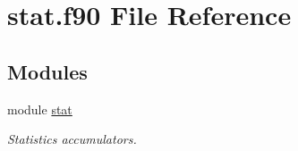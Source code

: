 \hypertarget{stat_8f90}{}\section{stat.\+f90 File Reference}
\label{stat_8f90}
\subsection*{Modules}
\begin{DoxyCompactItemize}
\item 
module \hyperlink{namespacestat}{stat}
\begin{DoxyCompactList}\small\item\em Statistics accumulators. \end{DoxyCompactList}\end{DoxyCompactItemize}
